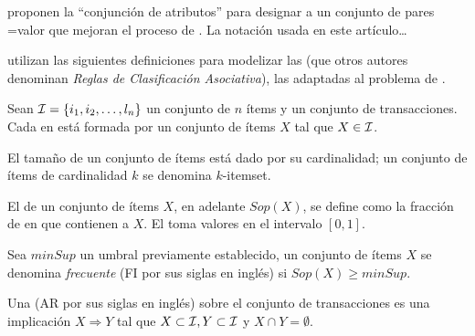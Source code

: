 
\citet{DeshpandeKarypis-UsingConjunctionofAttributeValuesforClassification-2002} proponen la "`conjunción de atributos"' para designar a un conjunto de pares \atributo=valor que mejoran el proceso de \Clasificacion. La notación usada en este artículo\ldots



\citet{HLeonCarrascoHPalancarMTrinidad-DesarrolloDeClasificadoresBasadosEnRA-2010} utilizan las siguientes definiciones para modelizar las \CAR (que otros autores denominan \emph{Reglas de Clasificación Asociativa}), las \ars adaptadas al problema de \Clasificacion.

Sean $\I = \{i_1,i_2,\ldots,l_n\}$ un conjunto de $n$ ítems y \T un conjunto de transacciones. Cada \transaccion en \T está formada por un conjunto de ítems $X$ tal que $X\in\I$.
\begin{defn}[\Itemset]
  El tamaño de un conjunto de ítems está dado por su cardinalidad; un conjunto de ítems de cardinalidad $k$ se denomina $k$-itemset.
\label{def:itemset}
\end{defn}

\begin{defn}[Soporte]
  El \soporte de un conjunto de ítems $X$, en adelante $Sop(X)$, se define como la fracción de \transacciones en \T que contienen a $X$. El \soporte toma valores en el intervalo $[0,1]$.
\label{def:soporte}
\end{defn}

\begin{defn}[$minSup$]
  Sea $minSup$ un umbral previamente establecido, un conjunto de ítems $X$ se denomina \emph{frecuente} (FI por sus siglas en inglés) si $Sop(X) \geq minSup$.
\label{def:flujo-de-datos}
\end{defn}

\begin{defn}[\AR]
  Una \AR (AR por sus siglas en inglés) sobre el conjunto de transacciones \T es una implicación $X\Rightarrow Y$ tal que $X\subset\I, Y\subset\I$ y $X\cap Y=\emptyset$.
\label{def:reglas-de-asociacion}
\end{defn}

